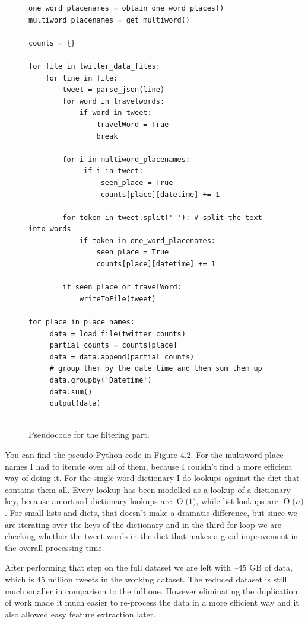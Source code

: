 \documentclass[minf,frontabs,twoside,singlespacing,parskip]{infthesis}
\newcommand{\BigO}[1]{\ensuremath{\operatorname{O}\bigl(#1\bigr)}}
\begin{document}
\begin{figure}[]
\begin{center}
\begin{lstlisting}
one_word_placenames = obtain_one_word_places()
multiword_placenames = get_multiword()

counts = {}

for file in twitter_data_files:
    for line in file:
        tweet = parse_json(line)
        for word in travelwords: 
            if word in tweet:
                travelWord = True
                break
                            
        for i in multiword_placenames:
             if i in tweet:
                 seen_place = True
                 counts[place][datetime] += 1
                            
        for token in tweet.split(' '): # split the text into words
            if token in one_word_placenames:
                seen_place = True
                counts[place][datetime] += 1

        if seen_place or travelWord:
            writeToFile(tweet)

for place in place_names:
     data = load_file(twitter_counts)
     partial_counts = counts[place]
     data = data.append(partial_counts)
     # group them by the date time and then sum them up
     data.groupby('Datetime')
     data.sum()
     output(data)
    
\end{lstlisting}
\end{center}
\caption{Pseudocode for the filtering part. }
\end{figure}

You can find the pseudo-Python code in Figure 4.2. For the multiword place names I had to iterate over all of them, because I couldn't find a more efficient way of doing it. For the single word dictionary I do lookups against the dict that contains them all. Every lookup has been modelled as a lookup of a dictionary key, because amortised dictionary lookups are  \BigO{1}, while list lookups are  \BigO{n}. For small lists and dicts, that doesn't make a dramatic difference, but since we are iterating over the keys of the dictionary and in the third for loop we are checking whether the tweet words in the dict that makes a good improvement in the overall processing time. 


After performing that step on the full dataset we are left with  \textasciitilde  45 GB of data, which is 45 million tweets in the working dataset. The reduced dataset is still much smaller in comparison to the full one. However eliminating the duplication of work made it much easier to re-process the data in a more efficient way and it also allowed easy feature extraction later. 
\end{document}

